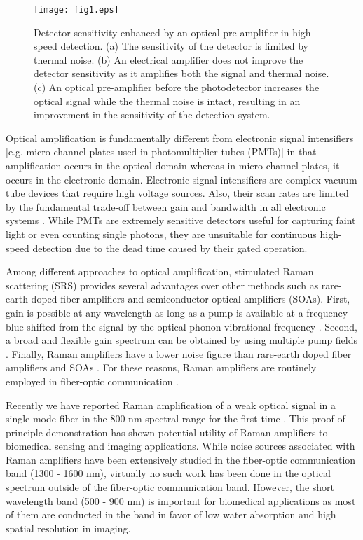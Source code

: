 \documentclass[10pt,letterpaper]{article}
\begin{document}
\begin{figure}[t]
\centering\texttt{[image: fig1.eps]}
\caption{Detector sensitivity enhanced by an optical pre-amplifier in high-speed detection. (a) The sensitivity of the detector is limited by thermal noise. (b) An electrical amplifier does not improve the detector sensitivity as it amplifies both the signal and thermal noise. (c) An optical pre-amplifier before the photodetector increases the optical signal while the thermal noise is intact, resulting in an improvement in the sensitivity of the detection system.}
\label{fig1}
\end{figure}

Optical amplification is fundamentally different from electronic signal intensifiers [e.g. micro-channel plates used in photomultiplier tubes (PMTs)] in that amplification occurs in the optical domain whereas in micro-channel plates, it occurs in the electronic domain. Electronic signal intensifiers are complex vacuum tube devices that require high voltage sources. Also, their scan rates are limited by the fundamental trade-off between gain and bandwidth in all electronic systems \cite{horowitz1989cambridgeunivpress}. While PMTs are extremely sensitive detectors useful for capturing faint light or even counting single photons, they are unsuitable for continuous high-speed detection due to the dead time caused by their gated operation. 

Among different approaches to optical amplification, stimulated Raman scattering (SRS) \cite{agrawal2006academic,islam2002ieee} provides several advantages over other methods such as rare-earth doped fiber amplifiers and semiconductor optical amplifiers (SOAs). First, gain is possible at any wavelength as long as a pump is available at a frequency blue-shifted from the signal by the optical-phonon vibrational frequency \cite{agrawal2006academic}. Second, a broad and flexible gain spectrum can be obtained by using multiple pump fields \cite{islam2002ieee}. Finally, Raman amplifiers have a lower noise figure than rare-earth doped fiber amplifiers and SOAs \cite{goda2009applphyslett,islam2002ieee}. For these reasons, Raman amplifiers are routinely employed in fiber-optic communication \cite{islam2002ieee}. 

Recently we have reported Raman amplification of a weak optical signal in a single-mode fiber in the 800 nm spectral range for the first time \cite{goda2009applphyslett,mahjoubfar2010cleo}. This proof-of-principle demonstration has shown potential utility of Raman amplifiers to biomedical sensing and imaging applications. While noise sources associated with Raman amplifiers have been extensively studied in the fiber-optic communication band (1300 - 1600 nm), virtually no such work has been done in the optical spectrum outside of the fiber-optic communication band. However, the short wavelength band (500 - 900 nm) is important for biomedical applications as most of them are conducted in the band in favor of low water absorption and high spatial resolution in imaging. 
\end{document}
